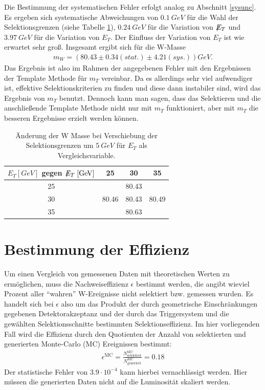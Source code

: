\documentclass[a4paper,12pt]{article}
\newcommand{\met}{\ensuremath{\not\mathrel{E}}_T}
\begin{document}
Die Bestimmung der systematischen Fehler erfolgt analog zu
Abschnitt \ref{sysunc}. Es ergeben sich systematische Abweichungen von $\SI{0.1}{GeV}$ für die Wahl der Selektionsgrenzen (siehe Tabelle \ref{tab:variation_et}), $\SI{0.24}{GeV}$
für die Variation von $\met$ und $\SI{3.97}{GeV}$ für die Variation von $E_{T}$. Der Einfluss der Variation von $E_{T}$ ist wie erwartet sehr groß.
Insgesamt ergibt sich für die W-Masse
\begin{align*}
	m_W = ( 80.43 ± 0.34 (stat.)± 4.21 (sys.)) \si{GeV}.
\end{align*}
Das Ergebnis ist also im Rahmen der angegebenen Fehler mit den Ergebnissen der Template Methode für
$m_{T}$ vereinbar.
Da es allerdings sehr viel aufwendiger ist, effektive Selektionskriterien zu finden und diese dann
instabiler sind, wird das Ergebnis von $m_T$ benutzt.
Dennoch kann man sagen, dass das Selektieren und die anschließende Template Methode nicht nur mit
$m_T$ funktioniert, aber mit $m_T$ die besseren Ergebnisse erzielt werden können.
\begin{table}[h]
	\centering
	\begin{tabular}{c| c c c}
		$E_{T} [\si{GeV}]$ gegen $\met[\si{GeV}]$ & 25 & 30 & 35 \\
		\hline
		25 &  & 80.43 & \\
		30 & 80.46 & 80.43 & 80.49 \\
		35 &  & 80.63 &
	\end{tabular}
	\caption{Änderung der W Masse bei Verschiebung der Selektionsgrenzen um $\SI{5}{GeV}$ für $E_T$
als Vergleichsvariable.}
	\label{tab:variation_et}
\end{table}
\section{Bestimmung der Effizienz}
\label{effizienz}
Um einen Vergleich von gemessenen Daten mit theoretischen Werten zu ermöglichen, muss die Nachweiseffizienz
$\epsilon$ bestimmt werden, die angibt wieviel Prozent aller "`wahren"' W-Ereignisse nicht selektiert bzw. gemessen wurden.
Es handelt sich bei $\epsilon$ also um das Produkt der durch geometrische Einschränkungen gegebenen Detektorakzeptanz und der
durch das Triggersystem und die gewählten Selektionsschnitte bestimmten Selektionseffizienz. Im hier vorliegenden Fall wird die
Effizienz durch den Quotienten der Anzahl von selektierten und generierten Monte-Carlo (MC) Ereignissen bestimmt:
\begin{align*}
	\epsilon^\text{MC} = \frac{N^\text{MC}_\text{selektiert}}{N^\text{MC}_\text{generiert}} = 0.18
\end{align*}
Der statistische Fehler von $3.9\cdot 10^{-4}$ kann hierbei vernachlässigt werden.
Hier müssen die generierten Daten nicht auf die Luminosität skaliert werden.
\end{document}
